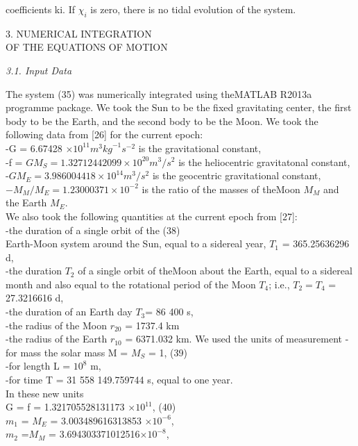 \documentclass[fontsize = 11pt,a4paper]{article}
\begin{document}
\begin{multicols}{2}
coefficients ki. If $\chi_i$ is zero, there is no tidal evolution
of the system.
\begin{center}
 3. NUMERICAL INTEGRATION\\
OF THE EQUATIONS OF MOTION
\end{center}
 \centerline{\emph{3.1. Input Data}}
The system (35) was numerically integrated using
theMATLAB R2013a programme package. We took
the Sun to be the fixed gravitating center, the first
body to be the Earth, and the second body to be the
Moon. We took the following data from [26] for the
current epoch:\\
\indent -G = 6.67428 $ \times {10}^{11} {m}^3 {kg}^{-1} {s}^{-2}$ is the gravitational
constant,\\
\indent -f = $GM_S = 1.32712442099 \times 10^{20} m^3/ s ^2$ is
the heliocentric gravitatonal constant,\\
\indent -$GM_E = 3.986004418 \times 10^{14} m^3 / s^2$ is the geocentric
gravitational constant,\\
\indent $-M_M / M_E = 1.23000371 \times 10^{-2}$ is the ratio of
the masses of theMoon $M_M$ and the Earth $M_E.$\\
We also took the following quantities at the current
epoch from [27]:\\
\indent-the duration of a single orbit of the \hfill (38)\\
Earth-Moon system around the Sun, equal 
to a sidereal year, $T_1$ = 365.25636296 d,\\
\indent-the duration $T_2$ of a single orbit of theMoon
about the Earth, equal to a sidereal month and
also equal to the rotational period of the Moon
$T_4$; i.e., $T_2 = T_4$ = 27.3216616 d,\\
\indent-the duration of an Earth day $T_3$= 86 400 s,\\
\indent-the radius of the Moon $r_20$ = 1737.4 km\\
\indent-the radius of the Earth $r_10$ = 6371.032 km.
We used the units of measurement
\indent-for mass the solar mass M = $M_S$ = 1, \hfill (39) \\
\indent-for length L = ${10}^8$ m,\\
\indent-for time T = 31 558 149.759744 s, equal to
one year.\\
In these new units\\
G = f = 1.321705528131173 $\times {10}^{11}$, \hfill (40)\\
$m_1$ = $M_E$ = 3.003489616313853 $ \times 10^{-6}$,\\
$m_2$ =$ M_M$ = 3.694303371012516$ \times 10^{-8}$,\\

\end{multicols}
\end{document}
